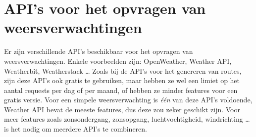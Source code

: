 \section{API's voor het opvragen van weersverwachtingen}

Er zijn verschillende API's beschikbaar voor het opvragen van weersverwachtingen.
Enkele voorbeelden zijn: OpenWeather, Weather API, Weatherbit, Weatherstack \ldots \@
Zoals bij de API's voor het genereren van routes, zijn deze API's ook gratis te gebruiken,
maar hebben ze wel een limiet op het aantal requests per dag of per maand, of hebben ze minder features voor een gratis versie.
Voor een simpele weersverwachting is \emph{één} van deze API's voldoende, Weather API bevat de meeste features,
dus deze zou zeker geschikt zijn. Voor meer features zoals zonsondergang, zonsopgang, luchtvochtigheid, windrichting \ldots \@
is het nodig om meerdere API's te combineren.







